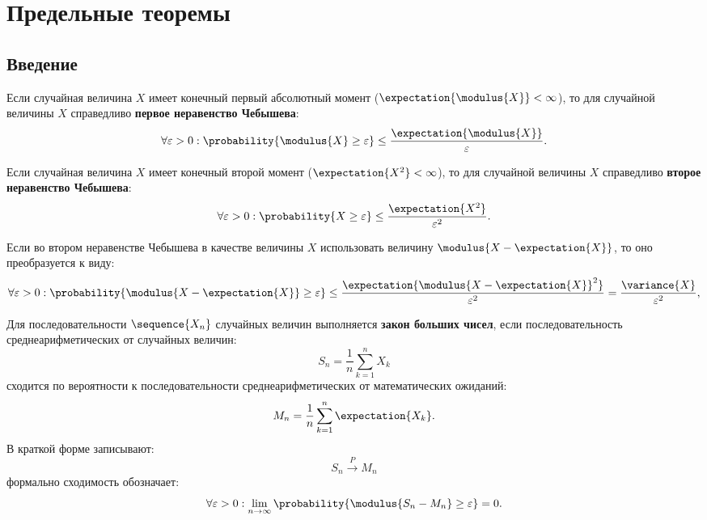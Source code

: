 \chapter{Предельные теоремы}


\section{Введение}

Если случайная величина $X$ имеет конечный первый абсолютный момент ($\expectation{\modulus{X}} < \infty$), то для случайной величины $X$ справедливо
\textbf{первое неравенство Чебышева}:
\begin{equation}
    \forall \varepsilon > 0 : \probability{ \modulus{X} \ge \varepsilon } \le \frac{\expectation{\modulus{X}}}{\varepsilon} .
\end{equation}

Если случайная величина $X$ имеет конечный второй момент ($\expectation{X^2} < \infty$), то для случайной величины $X$ справедливо \textbf{второе неравенство Чебышева}:
\begin{equation}
    \forall \varepsilon > 0 : \probability{ X \ge \varepsilon } \le \frac{\expectation{X^2}}{\varepsilon^2} .
\end{equation}

Если во втором неравенстве Чебышева в качестве величины $X$ использовать величину $\modulus{X - \expectation{X}}$, то оно преобразуется к виду:
\begin{equation}
    \forall \varepsilon > 0 : \probability{ \modulus{X - \expectation{X}} \ge \varepsilon } \le \frac{\expectation{\modulus{X - \expectation{X}}^2}}{\varepsilon^2} = \frac{\variance{X}}{\varepsilon^2} ,
\end{equation}

Для последовательности $\sequence{X_n}$ случайных величин выполняется \textbf{закон больших чисел}, если последовательность среднеарифметических от
случайных величин:
\begin{equation}
    S_n = \frac{1}{n} \sum_{k=1}^n X_k
\end{equation}
сходится по вероятности к последовательности среднеарифметических от математических ожиданий:
\begin{equation}
    M_n = \frac{1}{n} \sum_{k=1}^n \expectation{X_k} .
\end{equation}
В краткой форме записывают:
\begin{equation}
    S_n \stackrel{P}{\longrightarrow} M_n
\end{equation}
формально сходимость обозначает:
\begin{equation}
    \forall \varepsilon > 0: \lim_{n \rightarrow \infty} \probability{ \modulus{ S_n - M_n } \ge \varepsilon } = 0 .
\end{equation}

